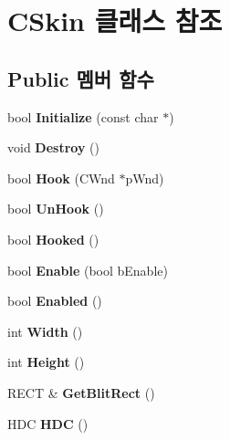 \hypertarget{class_c_skin}{}\section{C\+Skin 클래스 참조}
\label{class_c_skin}
\subsection*{Public 멤버 함수}
\begin{DoxyCompactItemize}
\item 
\mbox{\label{class_c_skin_ac9b8048b8c4a853574cc4c0f8b29827d}} 
bool {\bfseries Initialize} (const char $\ast$)
\item 
\mbox{\label{class_c_skin_a13edf7704211f61440871e17eda1d216}} 
void {\bfseries Destroy} ()
\item 
\mbox{\label{class_c_skin_a4897349a9944fe2e2ee9cfdc4f0baf47}} 
bool {\bfseries Hook} (C\+Wnd $\ast$p\+Wnd)
\item 
\mbox{\label{class_c_skin_ab8237ed204df8eb4632ef3bc921783a3}} 
bool {\bfseries Un\+Hook} ()
\item 
\mbox{\label{class_c_skin_a99b438d858bbafa83569f19e707ba3c9}} 
bool {\bfseries Hooked} ()
\item 
\mbox{\label{class_c_skin_ad6adaa12dbedc193c907d4a1b2c2445b}} 
bool {\bfseries Enable} (bool b\+Enable)
\item 
\mbox{\label{class_c_skin_adb8775c6c421ab3551b51e803bcf20d3}} 
bool {\bfseries Enabled} ()
\item 
\mbox{\label{class_c_skin_ae819e05e0e07c194d24bc8cdf5daeb94}} 
int {\bfseries Width} ()
\item 
\mbox{\label{class_c_skin_a26de0d121ce1811feea27cc30f4c2f70}} 
int {\bfseries Height} ()
\item 
\mbox{\label{class_c_skin_a8fe20ca67965deec6e5e29a2bf467933}} 
R\+E\+CT \& {\bfseries Get\+Blit\+Rect} ()
\item 
\mbox{\label{class_c_skin_a4112f4df38d9917d38c5db2622777c1f}} 
H\+DC {\bfseries H\+DC} ()
\end{DoxyCompactItemize}

